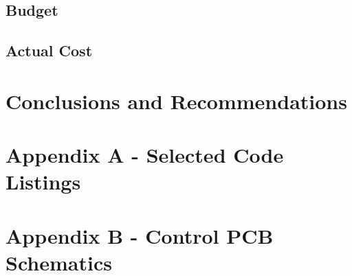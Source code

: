 \documentclass[oneside,final,a4paper]{report}
\begin{document}
\section{Budget}

\section{Actual Cost}


\chapter{Conclusions and Recommendations}

\chapter*{Appendix A - Selected Code Listings}

\chapter*{Appendix B - Control PCB Schematics}
\end{document}
